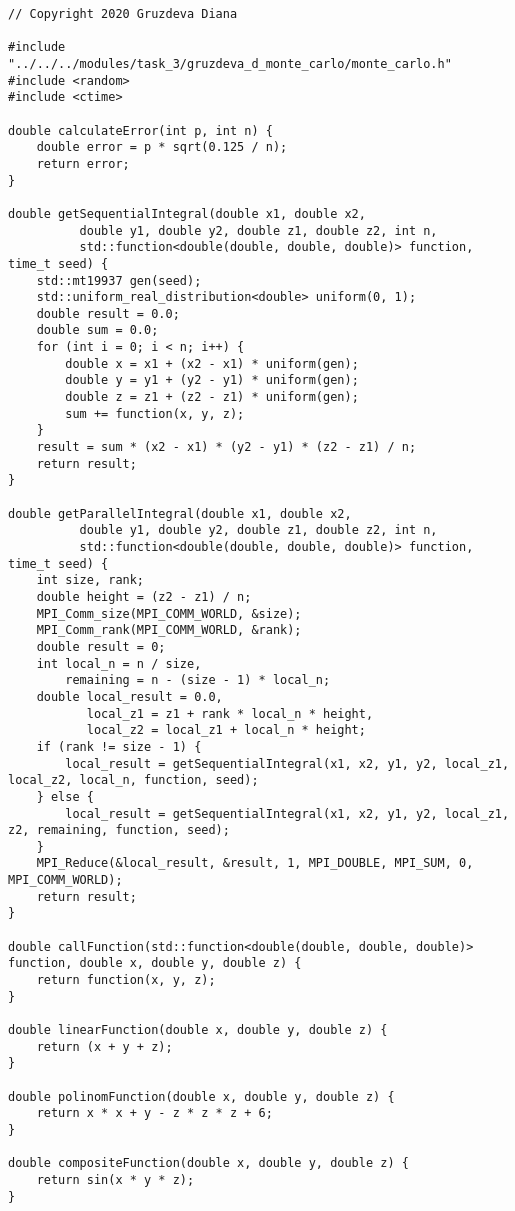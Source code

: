 \documentclass{report}
\begin{document}
\begin{lstlisting}
// Copyright 2020 Gruzdeva Diana

#include "../../../modules/task_3/gruzdeva_d_monte_carlo/monte_carlo.h"
#include <random>
#include <ctime>

double calculateError(int p, int n) {
    double error = p * sqrt(0.125 / n);
    return error;
}

double getSequentialIntegral(double x1, double x2,
          double y1, double y2, double z1, double z2, int n,
          std::function<double(double, double, double)> function, time_t seed) {
    std::mt19937 gen(seed);
    std::uniform_real_distribution<double> uniform(0, 1);
    double result = 0.0;
    double sum = 0.0;
    for (int i = 0; i < n; i++) {
        double x = x1 + (x2 - x1) * uniform(gen);
        double y = y1 + (y2 - y1) * uniform(gen);
        double z = z1 + (z2 - z1) * uniform(gen);
        sum += function(x, y, z);
    }
    result = sum * (x2 - x1) * (y2 - y1) * (z2 - z1) / n;
    return result;
}

double getParallelIntegral(double x1, double x2,
          double y1, double y2, double z1, double z2, int n,
          std::function<double(double, double, double)> function, time_t seed) {
    int size, rank;
    double height = (z2 - z1) / n;
    MPI_Comm_size(MPI_COMM_WORLD, &size);
    MPI_Comm_rank(MPI_COMM_WORLD, &rank);
    double result = 0;
    int local_n = n / size,
        remaining = n - (size - 1) * local_n;
    double local_result = 0.0,
           local_z1 = z1 + rank * local_n * height,
           local_z2 = local_z1 + local_n * height;
    if (rank != size - 1) {
        local_result = getSequentialIntegral(x1, x2, y1, y2, local_z1, local_z2, local_n, function, seed);
    } else {
        local_result = getSequentialIntegral(x1, x2, y1, y2, local_z1, z2, remaining, function, seed);
    }
    MPI_Reduce(&local_result, &result, 1, MPI_DOUBLE, MPI_SUM, 0, MPI_COMM_WORLD);
    return result;
}

double callFunction(std::function<double(double, double, double)> function, double x, double y, double z) {
    return function(x, y, z);
}

double linearFunction(double x, double y, double z) {
    return (x + y + z);
}

double polinomFunction(double x, double y, double z) {
    return x * x + y - z * z * z + 6;
}

double compositeFunction(double x, double y, double z) {
    return sin(x * y * z);
}
\end{lstlisting}
\end{document}
